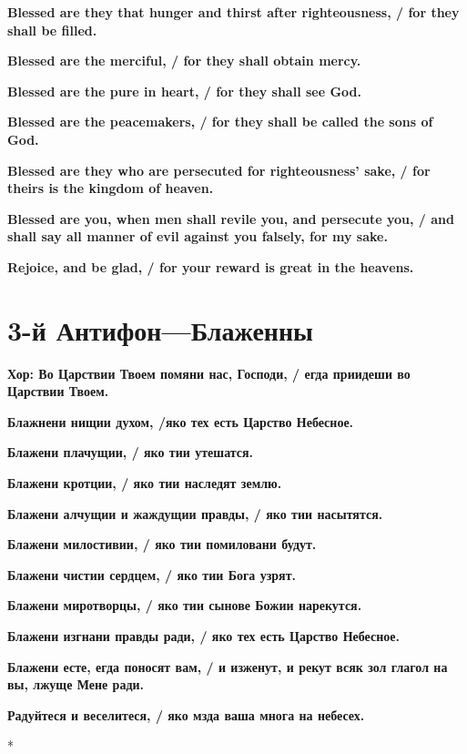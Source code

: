 \documentclass[12pt,a4paper,titlepage]{report}
\begin{document}
\begin{paracol}[1]{2}
	\textbf{Blessed are they that hunger and thirst after righteousness, / for they shall be filled.}
	
	\textbf{Blessed are the merciful, / for they shall obtain mercy.}
	
	\textbf{Blessed are the pure in heart, / for they shall see God.}
	
	\textbf{Blessed are the peacemakers, / for they shall be called the sons of God.}
	
	\textbf{Blessed are they who are persecuted for righteousness' sake, / for theirs is the kingdom of heaven.}
	
	\textbf{Blessed are you, when men shall revile you, and persecute you, / and shall say all manner of evil against you falsely, for my sake.}
	
	\textbf{Rejoice, and be glad, / for your reward is great in the heavens.}
	
	\switchcolumn[1]
	
	\section*{3-й Антифон---Блаженны}
	
	\textbf{Хор: Во Царствии Твоем помяни нас, Господи, / егда приидеши во Царствии Твоем.}
	
	\textbf{Блажнени нищии духом, /яко тех есть Царство Небесное.}
	
	\textbf{Блажени плачущии, / яко тии утешатся.}
	
	\textbf{Блажени кротции, / яко тии наследят землю.}
	
	\textbf{Блажени алчущии и жаждущии правды, / яко тии насытятся.}
	
	\textbf{Блажени милостивии, / яко тии помиловани будут.}
	
	\textbf{Блажени чистии сердцем, / яко тии Бога узрят.}
	
	\textbf{Блажени миротворцы, / яко тии сынове Божии нарекутся. }
	
	\textbf{Блажени изгнани правды ради, / яко тех есть Царство Небесное.}
	
	\textbf{Блажени есте, егда поносят вам, / и изженут, и рекут всяк зол глагол на вы, лжуще Мене ради. }
	
	\textbf{Радуйтеся и веселитеся, / яко мзда ваша многа на небесех.}
	
	\switchcolumn[0]*
	

\end{paracol}
\end{document}
